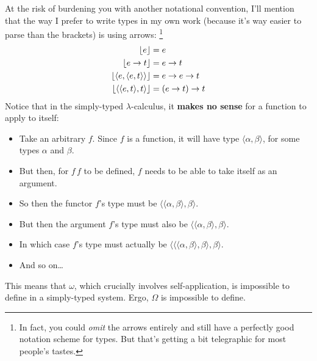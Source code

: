 \documentclass{article}
\newcommand{\ra}{\rightarrow}
\newcommand{\ab}[1]{\ensuremath{\langle #1 \rangle}}
\begin{document}
At the risk of burdening you with another notational convention, I'll mention
that the way I prefer to write types in my own work (because it's way easier to
parse than the brackets) is using arrows:%
\footnote{%
  In fact, you could \emph{omit} the arrows entirely and still have a perfectly
  good notation scheme for types. But that's getting a bit telegraphic for most
  people's tastes.
}
\begin{align}
  \notag
  \lfloor e \rfloor &= e
  \\\notag
  \lfloor e \ra t \rfloor &= e \ra t
  \\\notag
  \lfloor\ab{e, \ab{e, t}}\rfloor &= e \ra e \ra t
  \\\notag
  \lfloor\ab{\ab{e, t}, t}\rfloor &= (e \ra t) \ra t
\end{align}
%
Notice that in the simply-typed $\lambda$-calculus, it \textbf{makes no sense}
for a function to apply to itself:
\begin{itemize}
  \item
    Take an arbitrary $f$. Since $f$ is a function, it will have type
    \ab{\alpha, \beta}, for some types $\alpha$ and $\beta$. 

  \item 
    But then, for $f\,f$ to be defined, $f$ needs to be able to take itself as
    an argument. 

  \item 
    So then the functor $f$'s type must be \ab{\ab{\alpha, \beta}, \beta}. 
    
  \item
    But then the argument $f$'s type must also be \ab{\ab{\alpha, \beta},
    \beta}.
    
  \item
    In which case $f$'s type must actually be \ab{\ab{\ab{\alpha, \beta},
    \beta}, \beta}. 
    
  \item
    And so on\dots
\end{itemize}

This means that $\omega$, which crucially involves self-application, is
impossible to define in a simply-typed system. Ergo, $\Omega$ is impossible to
define. 
\end{document}
